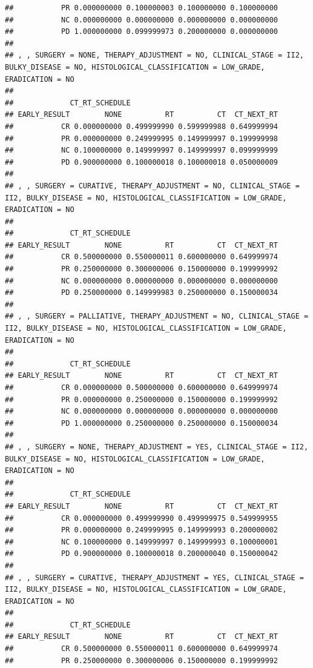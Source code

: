 \documentclass[]{article}
\begin{document}
\begin{verbatim}
##           PR 0.000000000 0.100000003 0.100000000 0.100000000
##           NC 0.000000000 0.000000000 0.000000000 0.000000000
##           PD 1.000000000 0.099999973 0.200000000 0.000000000
## 
## , , SURGERY = NONE, THERAPY_ADJUSTMENT = NO, CLINICAL_STAGE = II2, BULKY_DISEASE = NO, HISTOLOGICAL_CLASSIFICATION = LOW_GRADE, ERADICATION = NO
## 
##             CT_RT_SCHEDULE
## EARLY_RESULT        NONE          RT          CT  CT_NEXT_RT
##           CR 0.000000000 0.499999990 0.599999988 0.649999994
##           PR 0.000000000 0.249999995 0.149999997 0.199999998
##           NC 0.100000000 0.149999997 0.149999997 0.099999999
##           PD 0.900000000 0.100000018 0.100000018 0.050000009
## 
## , , SURGERY = CURATIVE, THERAPY_ADJUSTMENT = NO, CLINICAL_STAGE = II2, BULKY_DISEASE = NO, HISTOLOGICAL_CLASSIFICATION = LOW_GRADE, ERADICATION = NO
## 
##             CT_RT_SCHEDULE
## EARLY_RESULT        NONE          RT          CT  CT_NEXT_RT
##           CR 0.500000000 0.550000011 0.600000000 0.649999974
##           PR 0.250000000 0.300000006 0.150000000 0.199999992
##           NC 0.000000000 0.000000000 0.000000000 0.000000000
##           PD 0.250000000 0.149999983 0.250000000 0.150000034
## 
## , , SURGERY = PALLIATIVE, THERAPY_ADJUSTMENT = NO, CLINICAL_STAGE = II2, BULKY_DISEASE = NO, HISTOLOGICAL_CLASSIFICATION = LOW_GRADE, ERADICATION = NO
## 
##             CT_RT_SCHEDULE
## EARLY_RESULT        NONE          RT          CT  CT_NEXT_RT
##           CR 0.000000000 0.500000000 0.600000000 0.649999974
##           PR 0.000000000 0.250000000 0.150000000 0.199999992
##           NC 0.000000000 0.000000000 0.000000000 0.000000000
##           PD 1.000000000 0.250000000 0.250000000 0.150000034
## 
## , , SURGERY = NONE, THERAPY_ADJUSTMENT = YES, CLINICAL_STAGE = II2, BULKY_DISEASE = NO, HISTOLOGICAL_CLASSIFICATION = LOW_GRADE, ERADICATION = NO
## 
##             CT_RT_SCHEDULE
## EARLY_RESULT        NONE          RT          CT  CT_NEXT_RT
##           CR 0.000000000 0.499999990 0.499999975 0.549999955
##           PR 0.000000000 0.249999995 0.149999993 0.200000002
##           NC 0.100000000 0.149999997 0.149999993 0.100000001
##           PD 0.900000000 0.100000018 0.200000040 0.150000042
## 
## , , SURGERY = CURATIVE, THERAPY_ADJUSTMENT = YES, CLINICAL_STAGE = II2, BULKY_DISEASE = NO, HISTOLOGICAL_CLASSIFICATION = LOW_GRADE, ERADICATION = NO
## 
##             CT_RT_SCHEDULE
## EARLY_RESULT        NONE          RT          CT  CT_NEXT_RT
##           CR 0.500000000 0.550000011 0.600000000 0.649999974
##           PR 0.250000000 0.300000006 0.150000000 0.199999992

\end{verbatim}
\end{document}

